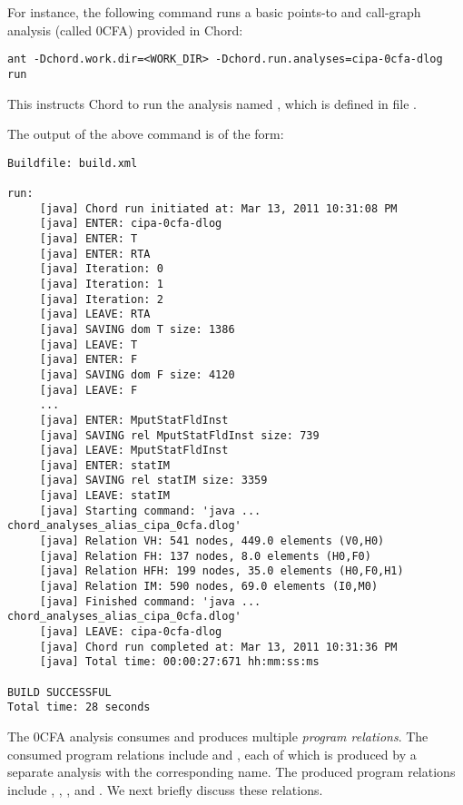 For instance, the following command runs a basic points-to and call-graph
analysis (called 0CFA) provided in Chord:

\begin{framed}
\begin{verbatim}
ant -Dchord.work.dir=<WORK_DIR> -Dchord.run.analyses=cipa-0cfa-dlog run
\end{verbatim}
\end{framed}

This instructs Chord to run the analysis named ,
which is defined in file .

The output of the above command is of the form:

\begin{framed}
{\small
\begin{verbatim}
Buildfile: build.xml

run:
     [java] Chord run initiated at: Mar 13, 2011 10:31:08 PM
     [java] ENTER: cipa-0cfa-dlog
     [java] ENTER: T
     [java] ENTER: RTA
     [java] Iteration: 0
     [java] Iteration: 1
     [java] Iteration: 2
     [java] LEAVE: RTA
     [java] SAVING dom T size: 1386
     [java] LEAVE: T
     [java] ENTER: F
     [java] SAVING dom F size: 4120
     [java] LEAVE: F
     ...
     [java] ENTER: MputStatFldInst
     [java] SAVING rel MputStatFldInst size: 739
     [java] LEAVE: MputStatFldInst
     [java] ENTER: statIM
     [java] SAVING rel statIM size: 3359
     [java] LEAVE: statIM
     [java] Starting command: 'java ... chord_analyses_alias_cipa_0cfa.dlog'
     [java] Relation VH: 541 nodes, 449.0 elements (V0,H0)
     [java] Relation FH: 137 nodes, 8.0 elements (H0,F0)
     [java] Relation HFH: 199 nodes, 35.0 elements (H0,F0,H1)
     [java] Relation IM: 590 nodes, 69.0 elements (I0,M0)
     [java] Finished command: 'java ... chord_analyses_alias_cipa_0cfa.dlog'
     [java] LEAVE: cipa-0cfa-dlog
     [java] Chord run completed at: Mar 13, 2011 10:31:36 PM
     [java] Total time: 00:00:27:671 hh:mm:ss:ms

BUILD SUCCESSFUL
Total time: 28 seconds
\end{verbatim}
}
\end{framed}

The 0CFA analysis consumes and produces multiple {\it program relations}.  The
consumed program relations include  and ,
each of which is produced by a separate analysis with the corresponding name.
The produced program relations include , , , and
.  We next briefly discuss these relations.

